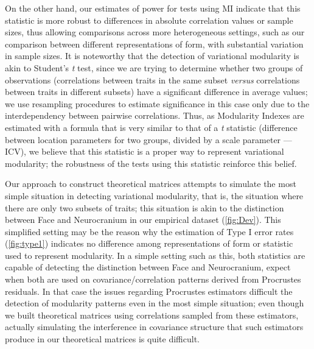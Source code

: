 \documentclass[12pt,]{article}
\begin{document}
On the other hand, our estimates of power for tests using MI indicate
that this statistic is more robust to differences in absolute
correlation values or sample sizes, thus allowing comparisons across
more heterogeneous settings, such as our comparison between different
representations of form, with substantial variation in sample sizes. It
is noteworthy that the detection of variational modularity is akin to
Student's \emph{t} test, since we are trying to determine whether two
groups of observations (correlations between traits in the same subset
\emph{versus} correlations between traits in different subsets) have a
significant difference in average values; we use resampling procedures
to estimate significance in this case only due to the interdependency
between pairwise correlations. Thus, as Modularity Indexes are estimated
with a formula that is very similar to that of a \emph{t} statistic
(difference between location parameters for two groups, divided by a
scale parameter --- ICV), we believe that this statistic is a proper way
to represent variational modularity; the robustness of the tests using
this statistic reinforce this belief.

Our approach to construct theoretical matrices attempts to simulate the
most simple situation in detecting variational modularity, that is, the
situation where there are only two subsets of traits; this situation is
akin to the distinction between Face and Neurocranium in our empirical
dataset (\autoref{fig:Dev}). This simplified setting may be the reason
why the estimation of Type I error rates (\autoref{fig:type1}) indicates
no difference among representations of form or statistic used to
represent modularity. In a simple setting such as this, both statistics
are capable of detecting the distinction between Face and Neurocranium,
expect when both are used on covariance/correlation patterns derived
from Procrustes residuals. In that case the issues regarding Procrustes
estimators difficult the detection of modularity patterns even in the
most simple situation; even though we built theoretical matrices using
correlations sampled from these estimators, actually simulating the
interference in covariance structure that such estimators produce in our
theoretical matrices is quite difficult.
\end{document}
